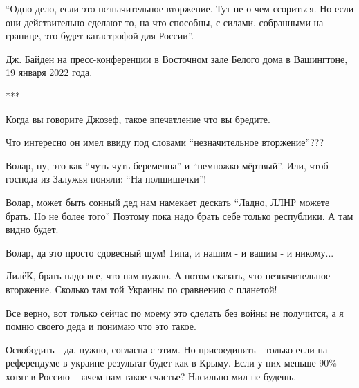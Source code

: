  
 
 
 
 
\zzSecCmt

\begin{itemize} %

\enquote{Одно дело, если это незначительное вторжение. Тут не о чем ссориться. Но если
они действительно сделают то, на что способны, с силами, собранными на границе,
это будет катастрофой для России}.

Дж. Байден на пресс-конференции в Восточном зале Белого дома в Вашингтоне, 19
января 2022 года.

***

Когда вы говорите Джозеф, такое впечатление что вы бредите.

Что интересно он имел ввиду под словами \enquote{незначительное вторжение}???

\begin{itemize} %

Волар, ну, это как \enquote{чуть-чуть беременна} и \enquote{немножко мёртвый}.
Или, чтоб господа из Залужья поняли: \enquote{На полшишечки}!


Волар, может быть сонный дед нам намекает дескать \enquote{Ладно, ЛЛНР можете брать. Но
не более того} Поэтому пока надо брать себе только республики. А там видно
будет.


Волар, да это просто сдовесный шум! Типа, и нашим - и вашим - и никому...


ЛилёК, брать надо все, что нам нужно. А потом сказать, что незначительное
вторжение. Сколько там той Украины по сравнению с планетой!
\end{itemize} %


Все верно, вот только сейчас по моему это сделать без войны не получится, а я
помню своего деда и понимаю что это такое.


Освободить - да, нужно, согласна с этим. Но присоединять - только если на
референдуме в украине результат будет как в Крыму. Если у них меньше 90\% хотят
в Россию - зачем нам такое счастье? Насильно мил не будешь.


\end{itemize}

